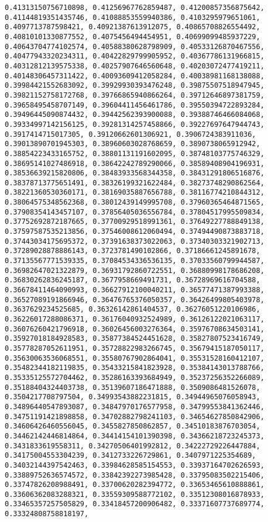 \documentclass[11pt]{article}
\begin{document}
\begin{Verbatim}[commandchars=\\\{\}]
0.41313150756710898, 0.41256967762859487, 0.41200857356875642, 0.41144819351435746, 0.41088853559940386, 0.4103295979651061, 0.4097713787598421, 0.40921387613912075, 0.40865708826554492, 0.40810101330877552, 0.4075456494454951, 0.40699099485937229, 0.40643704774102574, 0.40588380628798909, 0.40533126870467556, 0.40477943320234311, 0.40422829799905952, 0.40367786131966815, 0.40312812139575338, 0.40257907646560648, 0.40203072477419211, 0.40148306457311422, 0.40093609412058284, 0.40038981168138088, 0.39984421552683092, 0.39929930393476248, 0.39875507518947945, 0.39821152758172768, 0.39766865940866264, 0.39712646897381759, 0.39658495458707149, 0.39604411456461786, 0.39550394722893284, 0.39496445090874432, 0.39442562393900088, 0.39388746466084068, 0.39334997142156125, 0.39281314257458866, 0.39227697647944743, 0.3917414715017305, 0.39120662601306921, 0.3906724383911036, 0.39013890701945303, 0.38960603028768659, 0.3890738065912942, 0.38854223433165752, 0.38801131191602095, 0.38748103775746329, 0.38695141027486918, 0.38642242789290066, 0.38589408904196931, 0.38536639215820806, 0.38483933568344358, 0.38431291806516876, 0.38378713775651491, 0.38326199321622484, 0.38273748290862564, 0.38221360530360171, 0.38169035887656788, 0.38116774210844312, 0.38064575348562368, 0.38012439149995708, 0.37960365464871565, 0.37908354143457107, 0.37856405036556784, 0.37804517995509834, 0.37752692872187665, 0.37700929518991361, 0.37649227788849138, 0.37597587535213856, 0.37546008612060494, 0.37494490873883718, 0.37443034175695372, 0.37391638373022063, 0.37340303321902713, 0.37289028878886143, 0.3723781490102866, 0.37186661245891678, 0.37135567771539335, 0.37084534336536135, 0.37033560799944587, 0.36982647021322879, 0.36931792860722551, 0.36880998178686208, 0.36830262836245187, 0.3677958669491731, 0.36728969616704588, 0.36678411464090993, 0.36627912100040211, 0.36577471387993388, 0.36527089191866946, 0.36476765376050357, 0.36426499805403978, 0.3637629234525685, 0.36326142861404537, 0.36276051220106986, 0.36226017288086371, 0.36176040932524989, 0.36126122021063117, 0.36076260421796918, 0.36026456003276364, 0.35976708634503141, 0.35927018184928583, 0.35877384524451628, 0.35827807523416749, 0.35778287052611951, 0.35728822983266745, 0.35679415187050117, 0.35630063536068551, 0.35580767902864041, 0.35531528160412107, 0.35482344182119835, 0.35433215841823928, 0.35384143013788766, 0.35335125572704462, 0.35286163393684949, 0.35237256352266089, 0.35188404324403738, 0.35139607186471888, 0.3509086481526078, 0.3504217708797504, 0.34993543882231815, 0.34944965076058943, 0.34896440547893087, 0.34847970176577958, 0.34799553841362446, 0.34751191421898858, 0.34702882798241103, 0.34654627850842906, 0.34606426460556045, 0.3455827850862857, 0.34510183876703054, 0.34462142446814864, 0.34414154101390398, 0.34366218723245373, 0.3431833619558311, 0.34270506401992812, 0.34222729226447884, 0.34175004553304239, 0.3412733226729861, 0.3407971225354689, 0.34032144397542463, 0.33984628585154553, 0.33937164702626593, 0.33889752636574572, 0.33842392273985428, 0.33795083502215406, 0.33747826208988491, 0.33700620282394772, 0.33653465610888861, 0.33606362083288321, 0.33559309588772102, 0.33512308016878933, 0.33465357257505829, 0.33418457200906482, 0.33371607737689774, 0.33324808758818197, 
\end{Verbatim}
\end{document}
